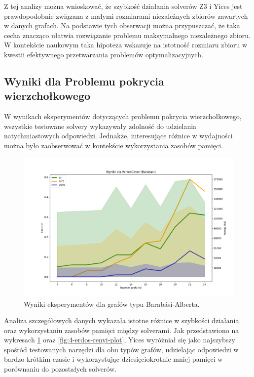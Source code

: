 Z tej analizy można wnioskować, że szybkość działania solverów Z3 i Yices jest prawdopodobnie związana z małymi rozmiarami niezależnych zbiorów zawartych w danych grafach. Na podstawie tych obserwacji można przypuszczać, że taka cecha znacząco ułatwia rozwiązanie problemu maksymalnego niezależnego zbioru. W kontekście naukowym taka hipoteza wskazuje na istotność rozmiaru zbioru w kwestii efektywnego przetwarzania problemów optymalizacyjnych.


\subsection{Wyniki dla Problemu pokrycia wierzchołkowego}

W wynikach eksperymentów dotyczących problemu pokrycia wierzchołkowego, wszystkie testowane solvery wykazywały zdolność do udzielania natychmiastowych odpowiedzi. Jednakże, interesujące różnice w wydajności można było zaobserwować w kontekście wykorzystania zasobów pamięci.

\begin{figure}[htbp]
	\centering
	\begin{minipage}{\textwidth}
		\includegraphics[width=\textwidth]{./figures/5-barabasi-plot.png}
		\caption{Wyniki eksperymentów dla grafów typu Barabási-Alberta.}
		\label{fig:5-barabasi-plot}
	\end{minipage}
\end{figure}

Analiza szczegółowych danych wykazała istotne różnice w szybkości działania oraz wykorzystaniu zasobów pamięci między solverami. Jak przedstawiono na wykresach \ref{fig:5-barabasi-plot} oraz \ref{fig:4-erdos-renyi-plot}, Yices wyróżniał się jako najszybszy spośród testowanych narzędzi dla obu typów grafów, udzielając odpowiedzi w bardzo krótkim czasie i wykorzystując dziesięciokrotnie mniej pamięci w porównaniu do pozostałych solverów.

